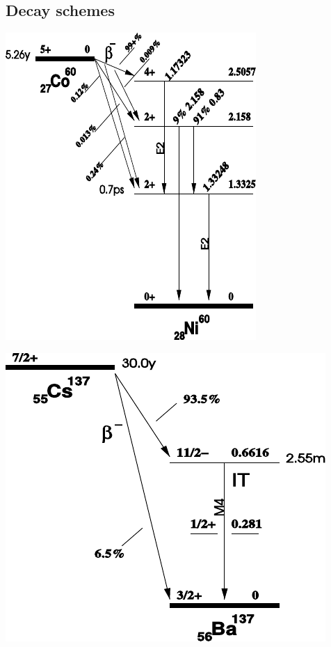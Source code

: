 \subsection{Decay schemes}
%
\vspace{10mm}
%
\begin{multicols}{2}
%
\minipage{\linewidth}
    \begin{center}
        \captionsetup{type=figure}
        \begin{adjustbox}{max width=\linewidth, keepaspectratio}
            \includegraphics[]{pdf/DecayScheme60Co}
        \end{adjustbox}
        \label{fig:60CoDecayScheme}
    \end{center}
\endminipage
%
\vspace{10mm}
%
\minipage{\linewidth}
    \begin{center}
        \captionsetup{type=figure}
        \begin{adjustbox}{max width=\linewidth, keepaspectratio}
            \includegraphics[]{pdf/DecayScheme137Cs}

\end{adjustbox}
\end{center}
\end{multicols}

